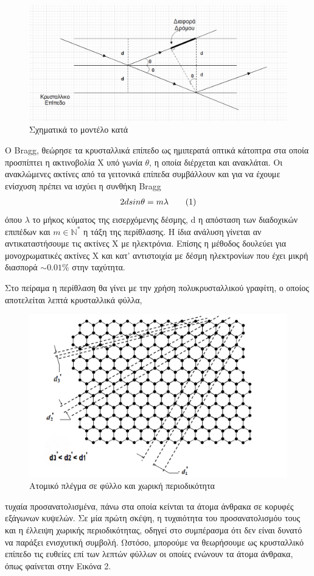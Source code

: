 \documentclass[a4paper]{article}
\newcommand\numberthis{\addtocounter{equation}{1}\tag{\theequation}}
\begin{document}
\begin{figure}
\includegraphics[width=1.3\linewidth]{bragg.png} 
\caption{Σχηματικά το μοντέλο κατά 	 }
\label{fig:wrapfig}
\end{figure}

O Bragg, θεώρησε τα κρυσταλλικά επίπεδο ως ημιπερατά οπτικά κάτοπτρα στα οποία προσπίπτει η ακτινοβολία Χ υπό γωνία $\theta$, η οποία διέρχεται και ανακλάται. Οι ανακλώμενες ακτίνες από τα γειτονικά επίπεδα συμβάλλουν και για να έχουμε ενίσχυση πρέπει να ισχύει η συνθήκη Bragg
\begin{align*}\label{3}
2dsin\theta=m\lambda \numberthis
\end{align*}
όπου $\lambda$ το μήκος κύματος της εισερχόμενης δέσμης, d η απόσταση των διαδοχικών επιπέδων και $m\in \mathbb{N}^*$ η τάξη της περίθλασης. 
Η ίδια ανάλυση γίνεται αν αντικαταστήσουμε τις ακτίνες Χ με ηλεκτρόνια. Επίσης η μέθοδος δουλεύει για μονοχρωματικές ακτίνες Χ και κατ' αντιστοιχία με δέσμη ηλεκτρονίων που έχει μικρή διασπορά $\sim 0.01\%$ στην ταχύτητα.

Στο πείραμα η περίθλαση θα γίνει με την χρήση πολυκρυσταλλικού γραφίτη, ο οποίος αποτελείται λεπτά κρυσταλλικά φύλλα,
\begin{figure}
 	\includegraphics[width=1.0\linewidth]{lattice.png}
 	\caption{ Ατομικό πλέγμα σε φύλλο και χωρική περιοδικότητα} 
 \end{figure} 	
  τυχαία προσανατολισμένα, πάνω στα οποία κείνται τα άτομα άνθρακα σε κορυφές εξάγωνων κυψελών. 
Σε μία πρώτη σκέψη, η τυχαιότητα του προσανατολισμόυ τους και η έλλειψη χωρικής περιοδικότητας,  οδηγεί στο συμπέρασμα ότι δεν είναι δυνατό να παράξει ενισχυτική συμβολή.
 Ωστόσο, μπορούμε να θεωρήσουμε ως κρυσταλλικό επίπεδο τις ευθείες επί των λεπτών φύλλων οι οποίες ενώνουν τα άτομα άνθρακα, όπως φαίνεται στην Εικόνα 2.
  
\end{document}
